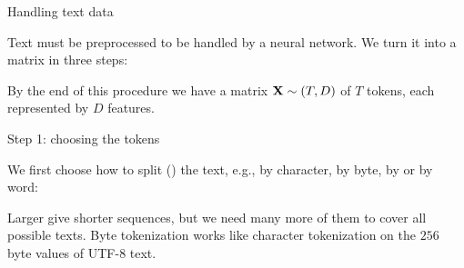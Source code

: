 
\begin{whiteframe}{Handling text data}

    Text must be preprocessed to be handled by a neural network. We turn it
    into a matrix in three steps:

    \vspace{0.3em}
    \begin{center}
        
    \end{center}

    \vspace{0.5em}
    {\raggedright
        By the end of this procedure we have a matrix $\boldsymbol{\mathbf{X}}\sim(T,D)$ of $T$
        tokens, each represented by $D$ features.\par}

\end{whiteframe}

\begin{whiteframe}{Step 1: choosing the tokens}
    \setlength{\parskip}{4pt}

    We first choose how to split () the text, e.g., by
    character, by byte, by  or by word:

    \begin{center}
        
    \end{center}

    Larger  give shorter sequences, but we need many more of
    them to cover all possible texts. Byte tokenization works like character
    tokenization on the $256$ byte values of UTF-8 text.


\end{whiteframe}

